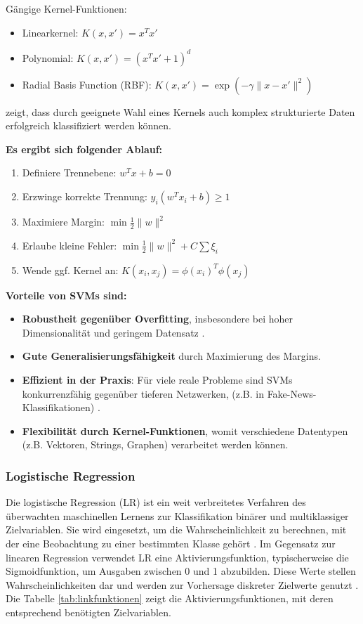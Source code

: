 Gängige Kernel-Funktionen:
\begin{itemize}
  \item Linearkernel: \( K(x, x') = x^T x' \)
  \item Polynomial: \( K(x, x') = (x^T x' + 1)^d \)
  \item Radial Basis Function (RBF): \( K(x, x') = \exp(-\gamma \|x - x'\|^2) \) \cite{jakkula2006tutorial}
\end{itemize}
\cite{Noble:2006aa} zeigt, dass durch geeignete Wahl eines Kernels auch komplex strukturierte Daten erfolgreich klassifiziert werden können.

\textbf{Es ergibt sich folgender Ablauf:}

\begin{enumerate}
  \item Definiere Trennebene: \( w^T x + b = 0 \)
  \item Erzwinge korrekte Trennung: \( y_i(w^T x_i + b) \geq 1 \)
  \item Maximiere Margin: \( \min \frac{1}{2} \|w\|^2 \)
  \item Erlaube kleine Fehler: \( \min \frac{1}{2} \|w\|^2 + C \sum \xi_i \)
  \item Wende ggf. Kernel an: \( K(x_i, x_j) = \phi(x_i)^T \phi(x_j) \)
\end{enumerate}

\textbf{Vorteile von SVMs sind:}

\begin{itemize}
    \item \textbf{Robustheit gegenüber Overfitting}, insbesondere bei hoher Dimensionalität und geringem Datensatz \cite{Noble:2006aa}.
    \item \textbf{Gute Generalisierungsfähigkeit} durch Maximierung des Margins.
    \item \textbf{Effizient in der Praxis}: Für viele reale Probleme sind SVMs konkurrenzfähig gegenüber tieferen Netzwerken, (z.B. in Fake-News-Klassifikationen) \cite{Buddhadev2025, sabir2025}.
    \item \textbf{Flexibilität durch Kernel-Funktionen}, womit verschiedene Datentypen (z.B. Vektoren, Strings, Graphen) verarbeitet werden können.
\end{itemize}

\subsubsection{Logistische Regression}

Die logistische Regression (LR) ist ein weit verbreitetes Verfahren des überwachten maschinellen Lernens zur Klassifikation binärer und 
multiklassiger Zielvariablen. Sie wird eingesetzt, um die Wahrscheinlichkeit zu berechnen, mit der eine Beobachtung zu einer 
bestimmten Klasse gehört \cite{elchami2025, aslam2022, SUDHAKAR2024101028}. Im Gegensatz zur linearen Regression verwendet LR eine Aktivierungsfunktion, 
typischerweise die Sigmoidfunktion, um Ausgaben zwischen 0 und 1 abzubilden. Diese Werte stellen Wahrscheinlichkeiten dar und werden zur 
Vorhersage diskreter Zielwerte genutzt \cite{aslam2022}. Die Tabelle \ref{tab:linkfunktionen} zeigt die Aktivierungsfunktionen, mit deren entsprechend
benötigten Zielvariablen.

